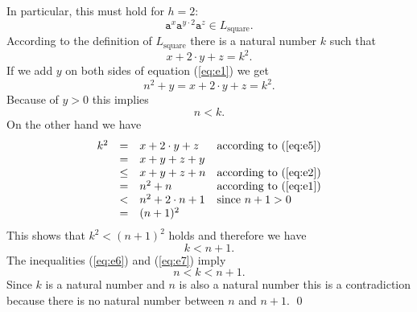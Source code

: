 In particular, this must hold for $h=2$:
\[ \mathtt{a}^x\mathtt{a}^{y\cdot 2}\mathtt{a}^z \in L_{\mathrm{square}}.  \]
According to the definition of $L_{\mathrm{square}}$ there is a natural number $k$ such that
\begin{equation}
  \label{eq:e5}
  x + 2\cdot y + z = k^2.
\end{equation}
If we add $y$ on both sides of equation (\ref{eq:e1}) we get
\[ n^2 + y = x + 2\cdot y + z = k^2. \]
Because of $y > 0$ this implies
\begin{equation}
  \label{eq:e6}
  n < k.    
\end{equation}
On the other hand we have
\[ 
\begin{array}[t]{lcll}
 k^2  & =    & x + 2 \cdot y + z       & \mbox{according to (\ref{eq:e5})}   \\
      & =    & x + y + z + y           &                                       \\
      & \leq & x + y + z + n           & \mbox{according to (\ref{eq:e2})} \\
      & =    & n^2 + n                 & \mbox{according to (\ref{eq:e1})}   \\
      & <    & n^2 + 2 \cdot n + 1     & \mbox{since $n+1 > 0$}                   \\ 
      & =    & (n + 1)^2               
\end{array}
\]
This shows that  $k^2 < (n+1)^2$ holds and therefore we have
\begin{equation}
  \label{eq:e7}
  k < n+1.
\end{equation}
The inequalities (\ref{eq:e6}) and (\ref{eq:e7}) imply
\[ n < k < n + 1. \]
Since $k$ is a natural number and $n$ is also a natural number this is a contradiction because there is no
natural number between  $n$ and $n+1$.
\qed


